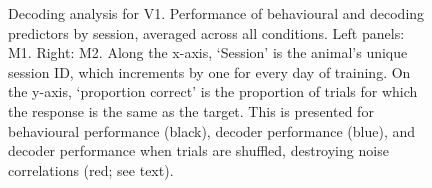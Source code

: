 \begin{figure}[htbp]
    \centering
    \hspace*{\fill}
    \hspace*{\fill}\hspace{.2cm}\hspace*{\fill}
    \hspace*{\fill}
    \caption{%
    Decoding analysis for \ac{V1}.
    Performance of behavioural and decoding predictors by session, averaged across all conditions.
    Left panels: \ac{M1}. Right: \ac{M2}.
	Along the x-axis, `Session' is the animal's unique session ID, which increments by one for every day of training.
    On the y-axis, `proportion correct' is the proportion of trials for which the response is the same as the target.
    This is presented for behavioural performance (black), decoder performance (blue), and decoder performance when trials are shuffled, destroying noise correlations (red; see text).
}
    \label{fig:dec_all_v1}
\end{figure}


